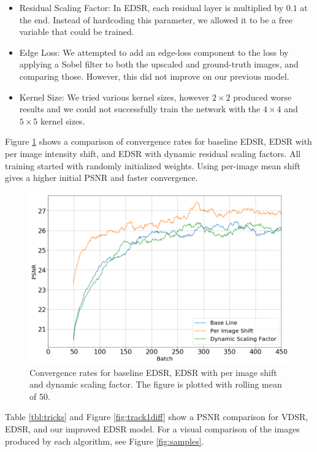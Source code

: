 \documentclass[10pt,twocolumn,letterpaper]{article}
\begin{document}
\begin{itemize}
	\item Residual Scaling Factor: In EDSR, each residual layer is multiplied by $0.1$ at the end. Instead of hardcoding this parameter, we allowed it to be a free variable that could be trained.
	\item Edge Loss: We attempted to add an edge-loss component to the loss by applying a Sobel filter to both the upscaled and ground-truth images, and comparing those. However, this did not improve on our previous model.
	\item Kernel Size: We tried various kernel sizes, however $2\times2$ produced worse results and we could not successfully train the network with the $4\times4$ and $5\times5$ kernel sizes.
\end{itemize}

Figure \ref{fig:convergence} shows a comparison of convergence rates for baseline EDSR, EDSR with per image intensity shift, and EDSR with dynamic residual scaling factors. All training started with randomly initialized weights. Using per-image mean shift gives a higher initial PSNR and faster convergence.

\begin{figure}
    \centering
    \includegraphics[width=\columnwidth]{Images/convergence.png}
    \caption{Convergence rates for baseline EDSR, EDSR with per image shift and dynamic scaling factor. The figure is plotted with rolling mean of 50.}
    \label{fig:convergence}
\end{figure}

Table \ref{tbl:tricks} and Figure \ref{fig:track1diff} show a PSNR comparison for VDSR, EDSR, and our improved EDSR model. For a visual comparison of the images produced by each algorithm, see Figure \ref{fig:samples}.
\end{document}
